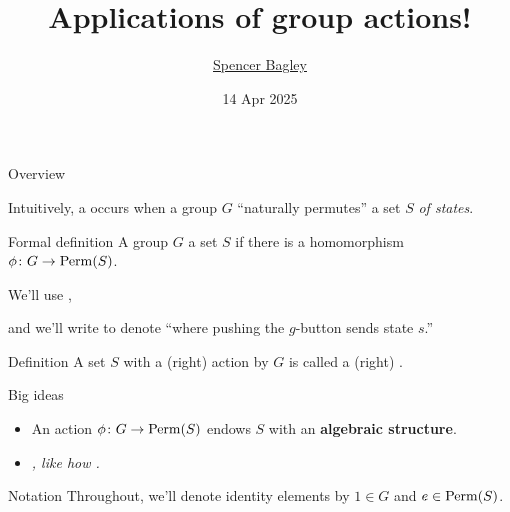 \documentclass[8pt, handout]{beamer}
\title[Applications of group actions!]{Applications of group actions!}
\author[\href{mailto:sbagley@westminsteru.edu}{S. Bagley}]
       {\href{mailto:sbagley@westminsteru.edu}{Spencer Bagley}}
\institute[Westminster] { 
  \normalsize With many thanks to Matthew Macauley, \\
  \url{http://www.math.clemson.edu/~macaule/}}
\date[14 Apr 2025]{14 Apr 2025}
\newcommand{\Pause}{}      %
\begin{document}
\frame{\titlepage}


\begin{frame}{Overview} %

  Intuitively, a  occurs when a group $G$
  ``naturally permutes'' a set $S$ \emph{of states}.

  \medskip

  \begin{block}{Formal definition}
    A group $G$  a set $S$ if there is a homomorphism
    $\phi\colon G\to\operatorname{Perm}(S)$. 

    We'll use ,
    
    and we'll write  to denote ``where pushing the $g$-button sends state $s$.''
  \end{block} 

  \begin{block}{Definition}
    A set $S$ with a (right) action by $G$ is called a (right)
    .
  \end{block} 
  
  \begin{alertblock}{Big ideas}
   \begin{itemize}
    \item An action $\phi\colon G\to\operatorname{Perm}(S)$ endows $S$ with an
      \textbf{algebraic structure}. 
    \item \emph{, like how
      .}
    \end{itemize}
  \end{alertblock}

  \begin{exampleblock}{Notation}
    Throughout, we'll denote identity elements by $1\in G$ and $e\in\operatorname{Perm}(S)$.
  \end{exampleblock}
  
\end{frame}

\end{document}

